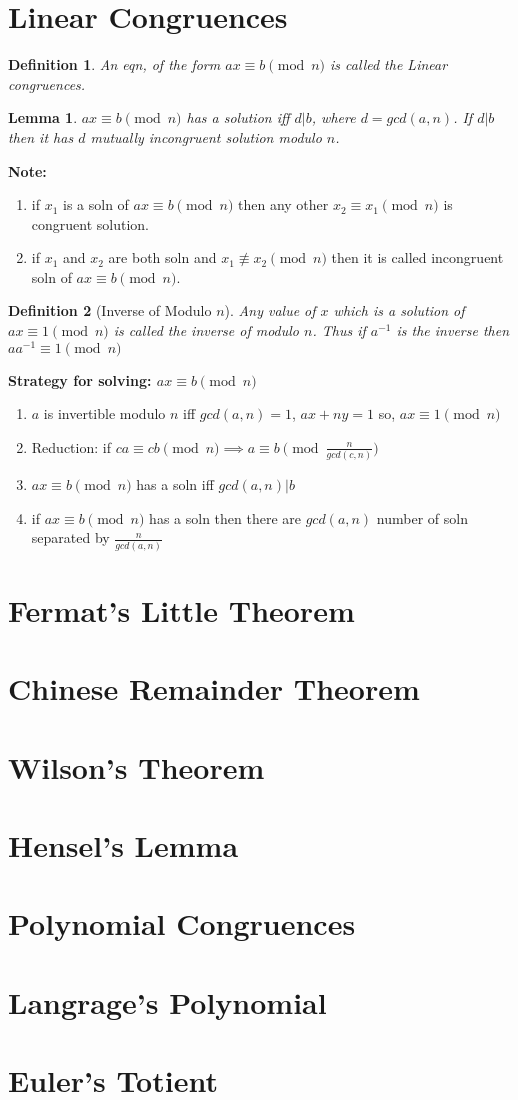 \documentclass[12pt,a4paper]{article}
\newtheorem{defn}{Definition}
\newtheorem{lem}{Lemma}
\begin{document}
\section{Linear Congruences}
\begin{defn}
	An eqn, of the form $ax\equiv b \pmod n$ is called the Linear congruences.
\end{defn}
\begin{lem}
	$ax \equiv b \pmod n$ has a solution iff $d|b$, where $d=gcd(a,n)$. If $d|b$ then it has $d$ mutually incongruent solution modulo $n$.
\end{lem}
\textbf{Note: }
\begin{enumerate}
	\item if $x_{1}$ is a soln of $ax \equiv b \pmod n$ then any other $x_{2} \equiv x_{1}  \pmod n$ is congruent solution.
	\item if $x_{1}$ and $x_{2}$ are both soln and  $x_{1} \not \equiv x_{2}  \pmod n$ then it is called incongruent soln of $ax \equiv b \pmod n$.
\end{enumerate}

\begin{defn}[Inverse of Modulo $n$]
Any value of $x$ which is a solution of $ax \equiv 1 \pmod n$ is called the inverse of modulo $n$. Thus if $a^{-1}$ is the inverse then $aa^{-1} \equiv 1 \pmod n$
\end{defn}

\textbf{Strategy for solving: $ax \equiv b \pmod n$}
\begin{enumerate}
	\item $a$ is invertible modulo $n$ iff $gcd(a,n)=1$, $ax+ny=1$ so, $ax\equiv 1 \pmod n$
	\item Reduction: if $ca\equiv cb \pmod n \implies a \equiv b \pmod {\frac{n}{gcd(c,n)}}$
	\item $ax \equiv b \pmod n$ has a soln iff $gcd(a,n)|b$
	\item if $ax \equiv b \pmod n$ has a soln then there are $gcd(a,n)$ number of soln separated by $\frac{n}{gcd(a,n)}$
\end{enumerate}

\section{Fermat's Little Theorem}
\section{Chinese Remainder Theorem}
\section{Wilson's Theorem}
\section{Hensel's Lemma}
\section{Polynomial Congruences}
\section{Langrage's Polynomial}
\section{Euler's Totient}
\end{document}
